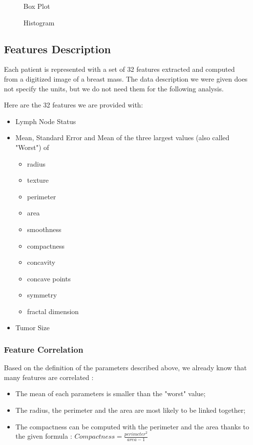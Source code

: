 \documentclass[]{report}
\newcommand{\inputtikz}[2]{%
	\scalebox{#1}{}  
}
\begin{document}
\begin{figure}[!hb]
	\centering
	\inputtikz{0.5}{Figures/time_boxplot.tex}
	\caption{Box Plot}
	\label{fig:time_boxplot}
\end{figure}

\begin{figure}[!h]
	\centering
	\inputtikz{0.5}{Figures/time_hist.tex}
	\caption{Histogram}
	\label{fig:time_hist}
\end{figure}


\subsection{Features Description}
Each patient is represented with a set of 32 features extracted and computed from a digitized image of a breast mass. The data description we were given does not specify the units, but we do not need them for the following analysis.

Here are the 32 features we are provided with:  
\begin{itemize}
	\item Lymph Node Status
	
	\item Mean, Standard Error and Mean of the three largest values (also called "Worst") of 
		\begin{itemize}
			\item radius
			\item texture
			\item perimeter
			\item area
			\item smoothness
			\item compactness
			\item concavity
			\item concave points
			\item symmetry
			\item fractal dimension
		\end{itemize}
	
	\item Tumor Size
\end{itemize}

\subsubsection{Feature Correlation}
Based on the definition of the parameters described above, we already know that many features are correlated :
\begin{itemize}
	\item The mean of each parameters is smaller than the "worst" value;
	\item The radius, the perimeter and the area are most likely to be linked together;
	\item The compactness can be computed with the perimeter and the area thanks to the given formula : $Compactness = \frac{perimeter^2}{area - 1}$
\end{itemize}
\end{document}
